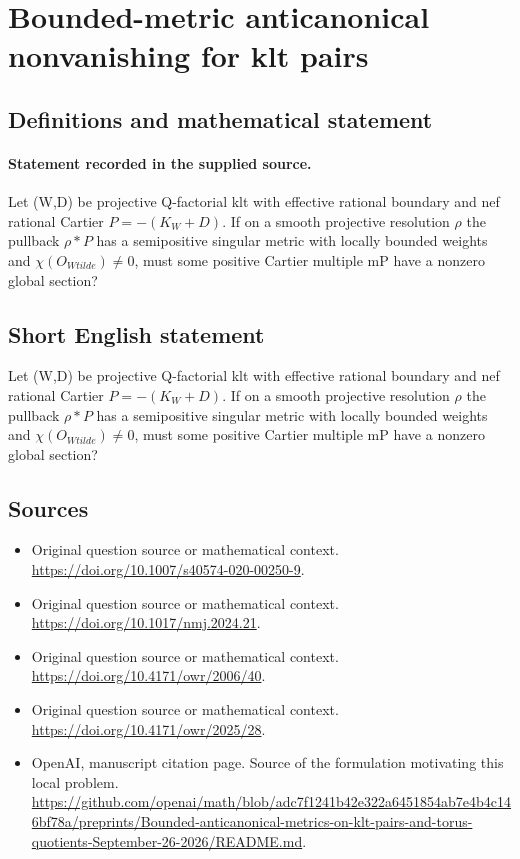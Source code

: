 \documentclass[11pt]{article}
\begin{document}
\section*{Bounded-metric anticanonical nonvanishing for klt pairs}\label{30007015}
\subsection{Definitions and mathematical statement}
\paragraph{Statement recorded in the supplied source.}
Let (W,D) be projective Q-factorial klt with effective rational boundary and nef rational Cartier $P=-(K_W+D)$. If on a smooth projective resolution $\rho $ the pullback $\rho *P$ has a semipositive singular metric with locally bounded weights and $\chi (O_{Wtilde})\neq 0$, must some positive Cartier multiple mP have a nonzero global section?
\subsection{Short English statement}
Let (W,D) be projective Q-factorial klt with effective rational boundary and nef rational Cartier $P=-(K_W+D)$. If on a smooth projective resolution $\rho $ the pullback $\rho *P$ has a semipositive singular metric with locally bounded weights and $\chi (O_{Wtilde})\neq 0$, must some positive Cartier multiple mP have a nonzero global section?
\subsection{Sources}
\begin{itemize}
\item[S1] Original question source or mathematical context.
\url{https://doi.org/10.1007/s40574-020-00250-9}.
\item[S2] Original question source or mathematical context.
\url{https://doi.org/10.1017/nmj.2024.21}.
\item[S3] Original question source or mathematical context.
\url{https://doi.org/10.4171/owr/2006/40}.
\item[S4] Original question source or mathematical context.
\url{https://doi.org/10.4171/owr/2025/28}.
\item[S5] OpenAI, manuscript citation page. Source of the formulation motivating this local problem.
\url{https://github.com/openai/math/blob/adc7f1241b42e322a6451854ab7e4b4c146bf78a/preprints/Bounded-anticanonical-metrics-on-klt-pairs-and-torus-quotients-September-26-2026/README.md}.
\end{itemize}
\end{document}
